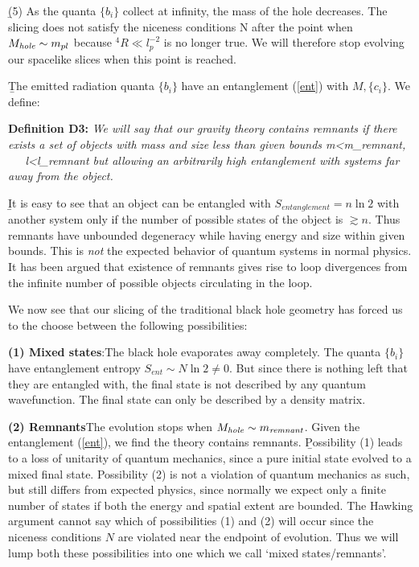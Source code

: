\documentclass[12pt]{article}
\begin{document}
\b

(5) As the quanta $\{ b_i\}$ collect at infinity, the mass of the hole decreases. The slicing does not satisfy the niceness conditions N after the point when
$
M_{\it hole}\sim m_{pl}
$
because ${}^4R\ll l_p^{-2}$ is no longer true. We will therefore stop evolving our spacelike slices when this point is reached.

\b

The emitted radiation quanta $\{b_i\}$ have an entanglement (\ref{ent}) with $M, \{ c_i\}$. We define:

\b

{\bf Definition D3:} {\it We will say that our gravity theory contains {\it remnants} if there exists a set of  objects with mass and size less than given bounds 
\be
m<m_{\it remnant}, ~~~l<l_{\it remnant}
\ee
but allowing an arbitrarily high entanglement with systems far away from the object.}

\b

It is easy to see that an object can be entangled with $S_{\mathit{entanglement}}=n\ln 2$ with another system only if the number of possible states of the object is $\gtrsim n$. Thus remnants have unbounded degeneracy while having energy and size within given bounds. This is {\it not} the expected behavior of quantum systems in normal physics. It has been argued that existence of remnants gives rise to loop divergences from the infinite number of possible objects circulating in the loop. 

We now see that our slicing of the traditional black hole geometry has forced us to the choose between the following possibilities:

\b


{\bf (1) Mixed states}:\quad  The black hole evaporates away completely. The quanta $\{ b_i\}$ have entanglement entropy
$
S_{\mathit{ent}}\sim N\ln 2\ne 0
\label{enentropy}
$.
But since there is nothing left that they are entangled with, the final state is not described by any quantum wavefunction. The final state can only be described  by a density matrix.


\b

{\bf (2) Remnants}\quad  The evolution stops when $M_{{\it hole}}\sim m_{\mathit{remnant}}$. Given the entanglement (\ref{ent}), we find the theory contains remnants.
\b

Possibility (1) leads to a loss of unitarity of quantum mechanics, since a pure initial state evolved to a mixed final state. Possibility (2) is not a violation of quantum mechanics as such, but still differs from expected physics, since normally we expect only a finite number of states if both the energy and spatial extent are bounded.   The Hawking argument cannot say which of possibilities (1) and (2) will occur since the niceness conditions $N$ are violated near the endpoint of evolution. Thus we will lump both these possibilities into one which we call `mixed states/remnants'.
\end{document}
